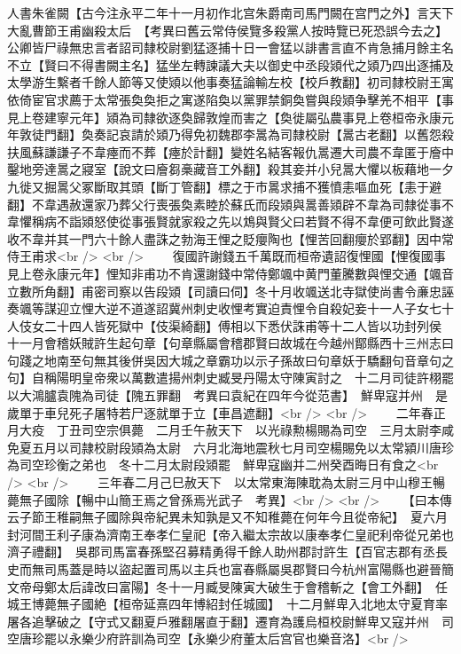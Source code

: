 人書朱雀闕【古今注永平二年十一月初作北宫朱爵南司馬門闕在宫門之外】言天下大亂曹節王甫幽殺太后　【考異曰舊云常侍侯覽多殺黨人按時覽已死恐誤今去之】公卿皆尸祿無忠言者詔司隸校尉劉猛逐捕十日一會猛以誹書言直不肯急捕月餘主名不立【賢曰不得書闕主名】猛坐左轉諫議大夫以御史中丞段熲代之熲乃四出逐捕及太學游生繫者千餘人節等又使熲以他事奏猛論輸左校【校戶教翻】初司隸校尉王寓依倚宦官求薦于太常張奐奐拒之寓遂陷奐以黨罪禁銅奐嘗與段熲争擊羌不相平【事見上卷建寧元年】熲為司隸欲逐奐歸敦煌而害之【奐徙屬弘農事見上卷桓帝永康元年敦徒門翻】奐奏記哀請於熲乃得免初魏郡李暠為司隸校尉【暠古老翻】以舊怨殺扶風蘇謙謙子不韋瘞而不葬【瘞於計翻】變姓名結客報仇暠遷大司農不韋匿于廥中鑿地旁達暠之寢室【說文曰廥芻槀藏音工外翻】殺其妾并小兒暠大懼以板藉地一夕九徙又掘暠父冢斷取其頭【斷丁管翻】標之于市暠求捕不獲憤恚嘔血死【恚于避翻】不韋遇赦還家乃葬父行喪張奐素睦於蘇氏而段熲與暠善熲辟不韋為司隸從事不韋懼稱病不詣熲怒使從事張賢就家殺之先以鴆與賢父曰若賢不得不韋便可飲此賢遂收不韋并其一門六十餘人盡誅之勃海王悝之貶癭陶也【悝苦回翻癭於郢翻】因中常侍王甫求<br />
<br />
　　復國許謝錢五千萬既而桓帝遺詔復悝國【悝復國事見上卷永康元年】悝知非甫功不肯還謝錢中常侍鄭颯中黄門董騰數與悝交通【颯音立數所角翻】甫密司察以告段熲【司讀曰伺】冬十月收颯送北寺獄使尚書令亷忠誣奏颯等謀迎立悝大逆不道遂詔冀州刺史收悝考實迫責悝令自殺妃妾十一人子女七十人伎女二十四人皆死獄中【伎渠綺翻】傅相以下悉伏誅甫等十二人皆以功封列侯　十一月會稽妖賊許生起句章【句章縣屬會稽郡賢曰故城在今越州鄮縣西十三州志曰句踐之地南至句無其後併吳因大城之章霸功以示子孫故曰句章妖于驕翻句音章句之句】自稱陽明皇帝衆以萬數遣揚州刺史臧旻丹陽太守陳寅討之　十二月司徒許栩罷以大鴻臚袁隗為司徒【隗五罪翻　考異曰袁紀在四年今從范書】　鮮卑寇并州　是歲單于車兒死子屠特若尸逐就單于立【車昌遮翻】<br />
<br />
　　二年春正月大疫　丁丑司空宗俱薨　二月壬午赦天下　以光祿勲楊賜為司空　三月太尉李咸免夏五月以司隷校尉段熲為太尉　六月北海地震秋七月司空楊賜免以太常潁川唐珍為司空珍衡之弟也　冬十二月太尉段熲罷　鮮卑寇幽并二州癸酉晦日有食之<br />
<br />
　　三年春二月己巳赦天下　以太常東海陳耽為太尉三月中山穆王暢薨無子國除【暢中山簡王焉之曾孫焉光武子　考異】<br />
<br />
　　【曰本傳云子節王稚嗣無子國除與帝紀異未知孰是又不知稚薨在何年今且從帝紀】　夏六月封河間王利子康為濟南王奉孝仁皇祀【帝入繼太宗故以康奉孝仁皇祀利帝從兄弟也濟子禮翻】　吳郡司馬富春孫堅召募精勇得千餘人助州郡討許生【百官志郡有丞長史而無司馬蓋是時以盜起置司馬以主兵也富春縣屬吳郡賢曰今杭州富陽縣也避晉簡文帝母鄭太后諱改曰富陽】冬十一月臧旻陳寅大破生于會稽斬之【會工外翻】　任城王博薨無子國絶【桓帝延熹四年博紹封任城國】　十二月鮮卑入北地太守夏育率屠各追擊破之【守式又翻夏戶雅翻屠直于翻】遷育為護烏桓校尉鮮卑又寇并州　司空唐珍罷以永樂少府許訓為司空【永樂少府董太后宫官也樂音洛】<br />

